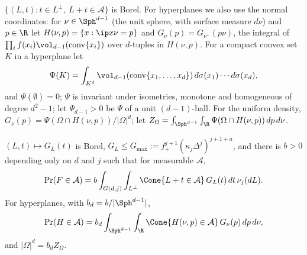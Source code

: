 $\{(L,t):t\in L^\perp,\ L+t\in\mathcal A\}$ is Borel. For hyperplanes we also use the normal coordinates: for $\nu\in\Sph^{d-1}$ (the unit
sphere, with surface measure $d\nu$) and $p\in\R$ let $H(\nu,p)=\{x:\ip x\nu=p\}$ and $G_\nu(p)=G_{\nu^\perp}(p\nu)$, the integral of
$\prod_if(x_i)\vol_{d-1}(\operatorname{conv}\{x_i\})$ over $d$-tuples in $H(\nu,p)$. For a compact convex set $K$ in a hyperplane let
\[
  \Psi(K)=\int_{K^d}\vol_{d-1}(\operatorname{conv}\{x_1,\dots,x_d\})\,d\sigma(x_1)\cdots d\sigma(x_d),
\]
and $\Psi(\emptyset)=0$; $\Psi$ is invariant under isometries, monotone and homogeneous of degree $d^2-1$; let $\Psi_{d-1}>0$ be $\Psi$
of a unit $(d-1)$-ball. For the uniform density, $G_\nu(p)=\Psi(\Omega\cap H(\nu,p))/|\Omega|^d$; let
$Z_\Omega=\int_{\Sph^{d-1}}\int_\R\Psi(\Omega\cap H(\nu,p))\,dp\,d\nu$.

\begin{lemma}[Representation]\label{lem:rep}
$(L,t)\mapsto G_L(t)$ is Borel, $G_L\le G_{\max}:=f_+^{j+1}(\kappa_j\Delta^j)^{j+1+a}$, and there is $b>0$ depending only on $d$ and
$j$ such that for measurable $\mathcal A$,
\begin{equation}\label{eq:BPj}
  \Pr(F\in\mathcal A)=b\int_{G(d,j)}\int_{L^\perp}\Cone\{L+t\in\mathcal A\}\,G_L(t)\,dt\,\nu_j(dL).
\end{equation}
For hyperplanes, with $b_d=b/|\Sph^{d-1}|$,
\begin{equation}\label{eq:BP}
  \Pr(H\in\mathcal A)=b_d\int_{\Sph^{d-1}}\int_\R\Cone\{H(\nu,p)\in\mathcal A\}\,G_\nu(p)\,dp\,d\nu ,
\end{equation}
and $|\Omega|^d=b_dZ_\Omega$.
\end{lemma}

